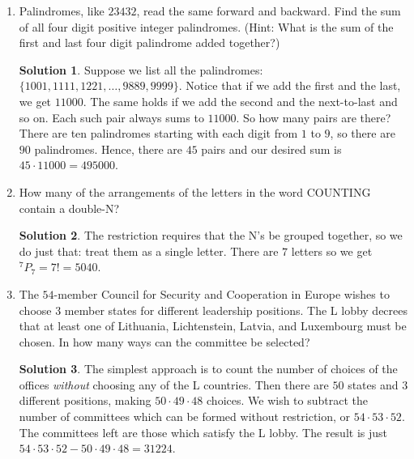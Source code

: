 \documentclass[twocolumn]{article}
\theoremstyle{definition}
\newtheorem*{solution}{Solution}
\begin{document}
\begin{enumerate}
        \item Palindromes, like $23432$, read the same forward and backward. Find the sum
        of all four digit positive integer palindromes. (Hint: What is the sum of the
        first and last four digit palindrome added together?)
        \begin{solution}
            Suppose we list all the palindromes: $\{1001, 1111, 1221, \dots, 9889, 9999\}$.
            Notice that if we add the first and the last, we get $11000$. The same holds
            if we add the second and the next-to-last and so on. Each such pair always sums
            to $11000$. So how many pairs are there? There are ten palindromes starting with
            each digit from $1$ to $9$, so there are $90$ palindromes. Hence, there are $45$
            pairs and our desired sum is $45 \cdot 11000 = 495000$.
        \end{solution}
        \item How many of the arrangements of the letters in the word COUNTING contain
        a double-N?
        \begin{solution}
            The restriction requires that the N's be grouped together, so we do just that:
            treat them as a single letter. There are $7$ letters so we get $^7P_7 = 7! = 
            5040$.
        \end{solution}
        \item The $54$-member Council for Security and Cooperation in Europe wishes to 
        choose $3$ member states for different leadership positions. The L lobby decrees that 
        at least one of Lithuania, Lichtenstein, Latvia, and Luxembourg must be chosen. In 
        how many ways can the committee be selected?
        \begin{solution}
            The simplest approach is to count the number of choices of the offices
            \emph{without} choosing any of the L countries. Then there are $50$ states and
            $3$ different positions, making $50 \cdot 49 \cdot 48$ choices. We wish to
            subtract the number of committees which can be formed without restriction, or
            $54 \cdot 53 \cdot 52$. The committees left are those which satisfy the L lobby.
            The result is just $54 \cdot 53 \cdot 52 - 50 \cdot 49 \cdot 48 = 31224$.
        \end{solution}
    \end{enumerate}
\end{document}
